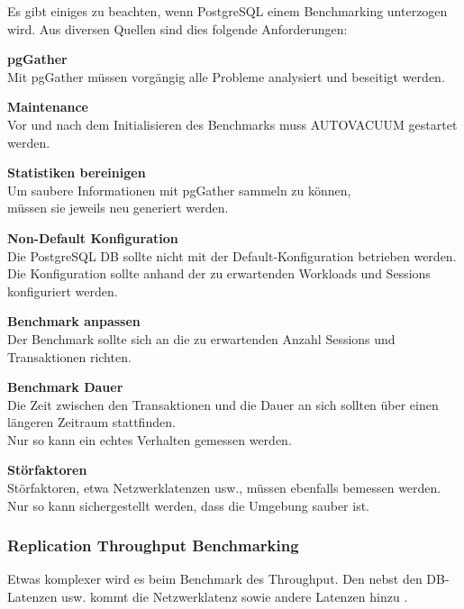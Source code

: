 \begin{flushleft}
    Es gibt einiges zu beachten, wenn PostgreSQL einem Benchmarking unterzogen wird.
    Aus diversen Quellen \cite{768DXXJK, 67TNVGTX, T3VEV98H, VXNYQFTE} sind dies folgende Anforderungen:
     \begin{description}
        \item \textbf{pgGather}\hfill \\Mit pgGather \cite{FGL8E2X5} müssen vorgängig alle Probleme analysiert und beseitigt werden.
        \item \textbf{Maintenance}\hfill \\Vor und nach dem Initialisieren des Benchmarks muss \Gls{AUTOVACUUM} gestartet werden.
        \item \textbf{Statistiken bereinigen}\hfill \\Um saubere Informationen mit pgGather sammeln zu können,\\müssen sie jeweils neu generiert werden.
        \item \textbf{Non-Default Konfiguration}\hfill \\Die PostgreSQL DB sollte nicht mit der Default-Konfiguration betrieben werden.\\Die Konfiguration sollte anhand der zu erwartenden Workloads und Sessions konfiguriert werden.
        \item \textbf{Benchmark anpassen}\hfill \\Der Benchmark sollte sich an die zu erwartenden Anzahl Sessions und \Gls{Transaktion}en richten.
        \item \textbf{Benchmark Dauer}\hfill \\Die Zeit zwischen den \Gls{Transaktion}en und die Dauer an sich sollten über einen längeren Zeitraum stattfinden.\\Nur so kann ein echtes Verhalten gemessen werden.
        \item \textbf{Störfaktoren}\hfill \\Störfaktoren, etwa Netzwerklatenzen \cite{5VBTYNB7} usw.,
        müssen ebenfalls bemessen werden.\\Nur so kann sichergestellt werden, dass die Umgebung sauber ist.
    \end{description}
\end{flushleft}
\begin{flushleft}
    \subsubsection{Replication Throughput Benchmarking}
    Etwas komplexer wird es beim Benchmark des Throughput.
    Den nebst den DB-Latenzen usw. kommt die Netzwerklatenz sowie andere Latenzen hinzu \cite{UU5X5NID}.
\end{flushleft}
